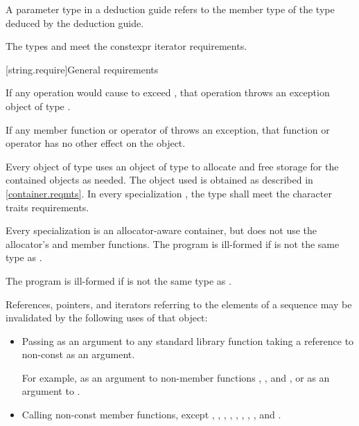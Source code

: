 \pnum
A  parameter type in
a  deduction guide
refers to the  member type of
the type deduced by the deduction guide.

\pnum
The types  and  meet
the constexpr iterator requirements.

[string.require]{General requirements}

\pnum
If any operation would cause  to
exceed , that operation throws an
exception object of type .

\pnum
If any member function or operator of  throws an exception, that
function or operator has no other effect on the  object.

\pnum
Every object of type
 uses an object of type
 to allocate and free storage for the contained 
objects as needed. The  object used is
obtained as described in \ref{container.reqmts}.
In every specialization ,
the type  shall meet
the character traits requirements.
\begin{note}
Every specialization  is
an allocator-aware container,
but does not use the allocator's  and 
member functions.
The program is ill-formed if
 is not the same type as .
\end{note}
\begin{note}
The program is ill-formed if 
is not the same type as .
\end{note}

\pnum
References, pointers, and iterators referring to the elements of a
 sequence may be
invalidated by the following uses of that  object:

\begin{itemize}
\item Passing as an argument to any standard library function taking a reference to non-const
 as an argument.
\begin{footnote}
For example, as an argument to non-member
functions ,
, and , or as
an argument to .
\end{footnote}

\item Calling non-const member functions, except
,
,
,
,
,
,
,
,
and
.
\end{itemize}

